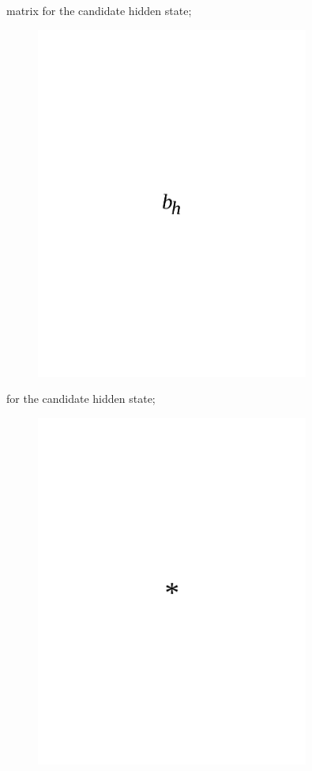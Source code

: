 matrix for the candidate hidden state;
\begin{figure}[H]
	\centering
	\includegraphics[width=0.8\textwidth]{media/ict/image74}
	\caption*{}
\end{figure}

for the candidate hidden state;
\begin{figure}[H]
	\centering
	\includegraphics[width=0.8\textwidth]{media/ict/image75}
	\caption*{}
\end{figure}

